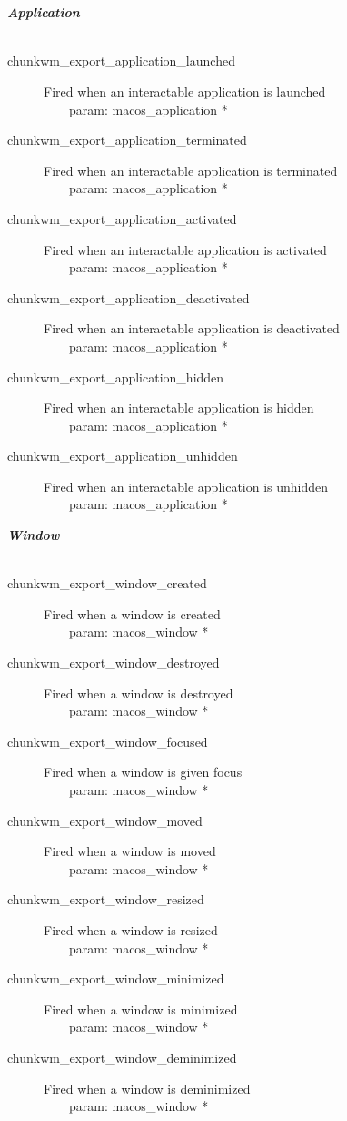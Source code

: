\documentclass[14pt,a4paper]{article}
\begin{document}
\medskip
\\\
\\\textbf{\textit{Application}}
\\\
\begin{description}
\item[chunkwm\_export\_application\_launched]
Fired when an interactable application is launched
\\\ \ \ \ param: macos\_application *
\item[chunkwm\_export\_application\_terminated]
Fired when an interactable application is terminated
\\\ \ \ \ param: macos\_application *
\item[chunkwm\_export\_application\_activated]
Fired when an interactable application is activated
\\\ \ \ \ param: macos\_application *
\item[chunkwm\_export\_application\_deactivated]
Fired when an interactable application is deactivated
\\\ \ \ \ param: macos\_application *
\item[chunkwm\_export\_application\_hidden]
Fired when an interactable application is hidden
\\\ \ \ \ param: macos\_application *
\item[chunkwm\_export\_application\_unhidden]
Fired when an interactable application is unhidden
\\\ \ \ \ param: macos\_application *
\medskip
\end{description}
\textbf{\textit{Window}}
\\\
\begin{description}
\item[chunkwm\_export\_window\_created]
Fired when a window is created
\\\ \ \ \ param: macos\_window *
\item[chunkwm\_export\_window\_destroyed]
Fired when a window is destroyed
\\\ \ \ \ param: macos\_window *
\item[chunkwm\_export\_window\_focused]
Fired when a window is given focus
\\\ \ \ \ param: macos\_window *
\item[chunkwm\_export\_window\_moved]
Fired when a window is moved
\\\ \ \ \ param: macos\_window *
\item[chunkwm\_export\_window\_resized]
Fired when a window is resized
\\\ \ \ \ param: macos\_window *
\item[chunkwm\_export\_window\_minimized]
Fired when a window is minimized
\\\ \ \ \ param: macos\_window *
\item[chunkwm\_export\_window\_deminimized]
Fired when a window is deminimized
\\\ \ \ \ param: macos\_window *
\medskip
\end{description}
\end{document}
